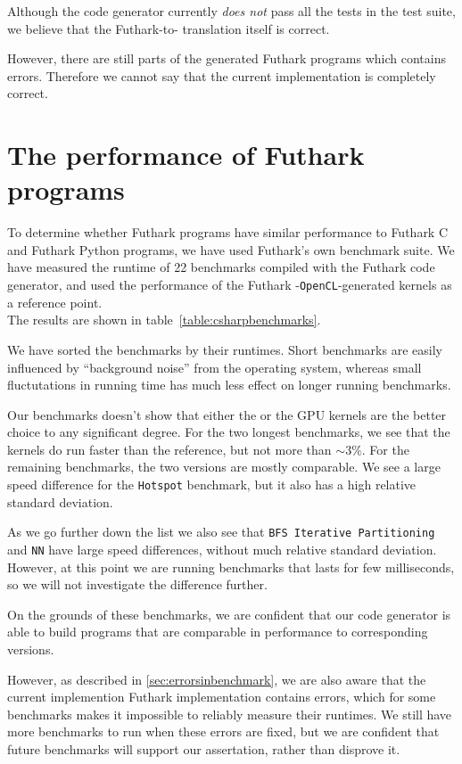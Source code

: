 Although the \csharp{} code generator currently \textit{does not} pass all the
tests in the test suite, we believe that the Futhark-to-\csharp{} translation
itself is correct.

However, there are still parts of the generated Futhark \csharp{} programs which
contains errors. Therefore we cannot say that the current implementation is
completely correct.

\section{The performance of Futhark \csharp{} programs}
\label{subsec:futharkcsharpperformance}
To determine whether Futhark \csharp{} programs have similar performance to
Futhark C and Futhark Python programs, we have used Futhark's own benchmark
suite.
We have measured the runtime of 22 benchmarks compiled with the Futhark
\csharp{} code generator, and used the performance of the Futhark
\clang{}-\texttt{OpenCL}-generated kernels as a reference point.\\
The results are shown in table~\ref{table:csharpbenchmarks}.

We have sorted the benchmarks by their runtimes.
Short benchmarks are easily influenced by ``background noise'' from the
operating system, whereas small fluctutations in running time has much less
effect on longer running benchmarks.

Our benchmarks doesn't show that either the \csharp{} or the \clang{} GPU
kernels are the better choice to any significant degree.
For the two longest benchmarks, we see that the \csharp{} kernels do run
faster than the reference, but not more than $\sim 3\%$. For the remaining
benchmarks, the two versions are mostly comparable. We see a large speed
difference for the \texttt{Hotspot} benchmark, but it also has a high relative
standard deviation.

As we go further down the list we also see that \texttt{BFS Iterative Partitioning} and
\texttt{NN} have large speed differences, without much relative standard
deviation. However, at this point we are running benchmarks that lasts for few
milliseconds, so we will not investigate the difference further.

On the grounds of these benchmarks, we are confident that our \csharp{} code
generator is able to build \csharp{} programs that are comparable in performance
to corresponding \clang{} versions.

However, as described in \ref{sec:errorsinbenchmark}, we are also aware that the
current implemention Futhark \csharp{} implementation contains errors, which for
some benchmarks makes it impossible to reliably measure their runtimes. We
still have more benchmarks to run when these errors are fixed, but we are
confident that future benchmarks will support our assertation, rather than
disprove it.

